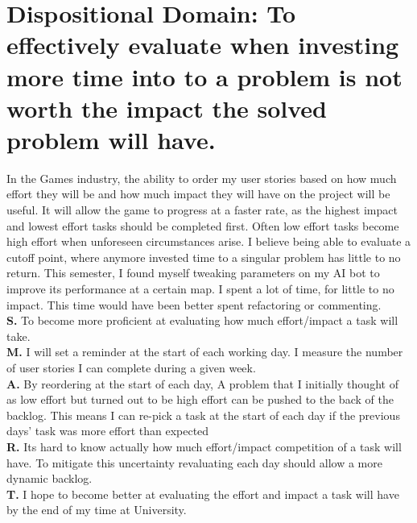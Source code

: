\documentclass{scrartcl}
\begin{document}
\section{Dispositional Domain: To effectively evaluate when investing more time into to a problem is not worth the impact the solved problem will have.}
In the Games industry, the ability to order my user stories based on how much effort  they will be and how much impact they will have on the project will be useful. It will allow the game to progress at a faster rate, as the highest impact and lowest effort tasks should be completed first. Often low effort tasks become high effort when unforeseen circumstances arise. I believe being able to evaluate a cutoff point, where anymore invested time to a singular problem has little to no return. This semester, I found myself tweaking parameters on my AI bot to improve its performance at a certain map. I spent a lot of time, for little to no impact. This time would have been better spent refactoring or commenting.\\
\textbf{S.}  To become more proficient at evaluating how much effort/impact a task will take.\\
\textbf{M.} I will set a reminder at the start of each working day. I measure the number of user stories I can complete during a given week.\\
\textbf{A.}  By reordering at the start of each day, A problem that I initially thought of as low effort but turned out to be high effort can be pushed to the back of the backlog. This means I can re-pick a task at the start of each day if the previous days' task was more effort than expected\\
\textbf{R.} Its hard to know actually how much effort/impact competition of a task will have. To mitigate this uncertainty revaluating each day should allow a more dynamic backlog.\\
\textbf{T.} I hope to become better at evaluating  the effort and impact a task will have by the end of my time at University.
\end{document}
